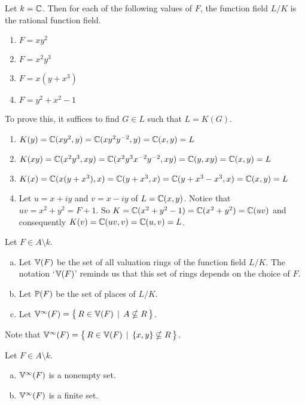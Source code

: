 \begin{example} \label {ue0982rhr329r23jew}
	Let $k = \mathbb{C}$. Then for each of
	the following values of $F$, the function 
	field $L/K$ is the rational 
	function field.

	\begin{enumerate}
		\item $F = xy^2$
		\item $F = x^2y^3$
		\item $F = x(y+x^3)$ 
		\item $F = y^2 + x^2 - 1$
	\end{enumerate}
	To prove this, it suffices to find $G \in L$ such that $L = K(G)$.
	\begin{enumerate}
		\item $K(y)=\mathbb{C} (xy^2,y) = \mathbb{C} (xy^2y^{-2},y)=\mathbb{C} (x,y) = L$
		\item $K(xy)=\mathbb{C}(x^2y^3,xy)=\mathbb{C}(x^2y^3x^{-2}y^{-2},xy)=\mathbb{C}(y,xy)=\mathbb{C}(x,y)=L$
		\item $K(x)= \mathbb{C}(x(y+x^3),x)=\mathbb{C}(y+x^3,x)=\mathbb{C}(y+x^3 - x^3,x)=\mathbb{C}(x,y)=L$ 
		\item Let $u = x+iy$ and $v=x-iy$ of $L=\mathbb{C}(x,y)$. 
		Notice that $uv=x^2+y^2 = F + 1$.  
		So $K = \mathbb{C}(x^2+y^2-1) = \mathbb{C}(x^2+y^2) = \mathbb{C}(uv)$ and
		consequently $K(v) = \mathbb{C}(uv,v) = \mathbb{C}(u,v) = L$.
	\end{enumerate} 
\end{example}

\begin{notation}
	Let $F \in A \setminus  k$.
	\begin{enumerate}[(a)]
		\item Let $\mathbb{V}(F)$ be the set of all valuation rings of the function field $L/K$.
		The notation `$\mathbb{V}(F)$' reminds us that this set of rings depends on the choice of $F$.
		\item Let $\mathbb{P}(F)$ be the set of places of $L/K$.
		\item Let $\mathbb{V}^\infty(F) = \big\{\, R \in \mathbb{V}(F) \, \mid \, A \nsubseteq R \, \big\}$.
	\end{enumerate}
	Note that $\mathbb{V}^\infty(F) = \big\{\, R \in \mathbb{V}(F) \, \mid \, \{x,y\} \nsubseteq R \, \big\}$.
\end{notation}


\begin{proposition} \label {3o9jdb9182so}
	Let $F \in A \setminus  k$.
	\begin{enumerate}[(a)]
	\item \label{notmempty} $\mathbb{V}^\infty(F)$ is a nonempty set.
	\item \label{finite} $\mathbb{V}^\infty(F)$ is a finite set.
	\end{enumerate}
\end{proposition}

